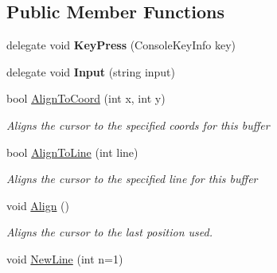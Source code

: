 \subsection*{Public Member Functions}
\begin{DoxyCompactItemize}
\item 
\hypertarget{class_m_b_c_1_1_terminal_1_1_terminal_module_a5f627dfca5b6cfc6ea790497420a2210}{delegate void {\bfseries Key\-Press} (Console\-Key\-Info key)}\label{class_m_b_c_1_1_terminal_1_1_terminal_module_a5f627dfca5b6cfc6ea790497420a2210}

\item 
\hypertarget{class_m_b_c_1_1_terminal_1_1_terminal_module_a3482090dcfc14c272b8597cbd14eb9cf}{delegate void {\bfseries Input} (string input)}\label{class_m_b_c_1_1_terminal_1_1_terminal_module_a3482090dcfc14c272b8597cbd14eb9cf}

\item 
bool \hyperlink{class_m_b_c_1_1_terminal_1_1_terminal_module_a00ddaad41f6394f22f0b09c98e47482f}{Align\-To\-Coord} (int x, int y)
\begin{DoxyCompactList}\small\item\em Aligns the cursor to the specified coords for this buffer\end{DoxyCompactList}\item 
bool \hyperlink{class_m_b_c_1_1_terminal_1_1_terminal_module_a11c6171e27a303575a6dd27e97dc95ab}{Align\-To\-Line} (int line)
\begin{DoxyCompactList}\small\item\em Aligns the cursor to the specified line for this buffer\end{DoxyCompactList}\item 
\hypertarget{class_m_b_c_1_1_terminal_1_1_terminal_module_a04ae520b8cbd2837f74b4bf699cc2b45}{void \hyperlink{class_m_b_c_1_1_terminal_1_1_terminal_module_a04ae520b8cbd2837f74b4bf699cc2b45}{Align} ()}\label{class_m_b_c_1_1_terminal_1_1_terminal_module_a04ae520b8cbd2837f74b4bf699cc2b45}

\begin{DoxyCompactList}\small\item\em Aligns the cursor to the last position used.\end{DoxyCompactList}\item 
\hypertarget{class_m_b_c_1_1_terminal_1_1_terminal_module_a835f19d34030f1f351a0bc95ee388d78}{void \hyperlink{class_m_b_c_1_1_terminal_1_1_terminal_module_a835f19d34030f1f351a0bc95ee388d78}{New\-Line} (int n=1)}\label{class_m_b_c_1_1_terminal_1_1_terminal_module_a835f19d34030f1f351a0bc95ee388d78}


\end{DoxyCompactItemize}
